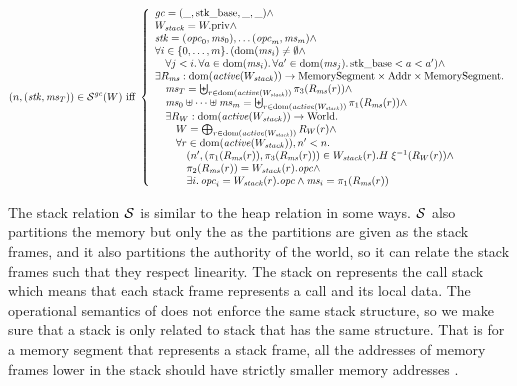 \begin{jversion}
\begin{definition}
  \label{def:stack-rel}
\[
  \memSatStack{\stk,\ms_T}{W} \text{ iff } 
  \left\{
    \begin{array}{l}
      \gc = (\_,\stkb,\_,\_) \wedge \\
      W_\var{stack} = \pwpriv \wedge \\
      \stk = (\opc_0,\ms_0), \dots (\opc_m,\ms_m) \wedge \\
      \forall i \in \{0,\dots,m\} \ldotp (\dom(\ms_i) \neq \emptyset \wedge\\
      \quad \forall j < i \ldotp \forall a \in \dom(\ms_i) \ldotp \forall a' \in \dom(\ms_j) \ldotp \stkb < a < a') \wedge\\
      \exists R_\ms : \dom(\activeReg{W_\var{stack}}) \fun \MemSeg \times \Addr \times \MemSeg \ldotp \\
      \quad \ms_T = \biguplus_{r \in \dom(\activeReg{W_\var{stack}})} \pi_3(R_\ms(r)) \wedge \\
      \quad \ms_0 \uplus \dots \uplus \ms_m = \biguplus_{r \in \dom(\activeReg{W_\var{stack}})} \pi_1(R_\ms(r)) \wedge \\
      \quad \exists R_W : \dom(\activeReg{W_\var{stack}}) \fun \World \ldotp \\
      \qquad W = \bigoplus_{r \in \dom(\activeReg{W_\var{stack}})} R_W(r) \wedge \\
      \qquad \forall r \in \dom(\activeReg{W_\var{stack}}), n' < n\ldotp \\
      \qquad \quad \npair[n']{(\pi_1(R_\ms(r)),\pi_3(R_\ms(r))} \in W_\var{stack}(r).H \; \xi^{-1}(R_W(r)) \wedge\\
      \qquad \quad \pi_2(R_\ms(r)) = W_\var{stack}(r).\opc \wedge\\
      \qquad \quad \exists i \ldotp \opc_i = W_\var{stack}(r).\opc \wedge \ms_i = \pi_1 (R_\ms(r))
    \end{array}
  \right.
\]
\end{definition}
The stack relation $\lrstk[]$ is similar to the heap relation in some ways.
$\lrstk[]$ also partitions the memory but only the \trgcm{} as the \srccm{} partitions are given as the stack frames, and it also partitions the authority of the world, so it can relate the stack frames such that they respect linearity.
The stack on \srccm{} represents the call stack which means that each stack frame represents a call and its local data.
The operational semantics of \trgcm{} does not enforce the same stack structure, so we make sure that a \srccm{} stack is only related to \trgcm{} stack that has the same structure.
That is for a memory segment that represents a stack frame, all the addresses of memory frames lower in the stack should have strictly smaller memory addresses .

\end{jversion}
